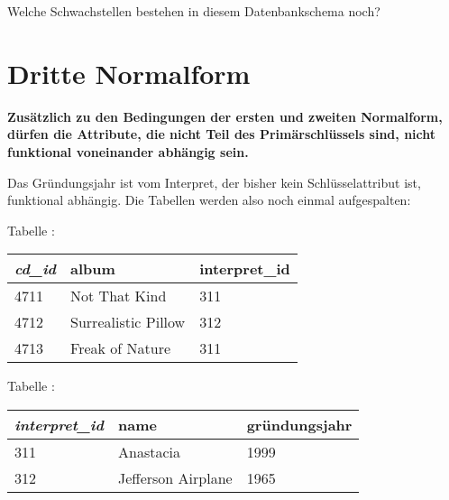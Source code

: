 Welche Schwachstellen bestehen in diesem Datenbankschema noch?


\section{Dritte Normalform}

\textbf{Zusätzlich zu den Bedingungen der ersten und zweiten Normalform, dürfen
die Attribute, die nicht Teil des Primärschlüssels sind, nicht funktional
voneinander abhängig sein.}

Das Gründungsjahr ist vom Interpret, der bisher kein Schlüsselattribut ist,
funktional abhängig. Die Tabellen werden also noch einmal aufgespalten:

\begin{minipage}{0.48\textwidth}
Tabelle :

\vspace{2mm}

\hspace{0mm}
\begin{tabular}{|l|l|l|}\hline
\textbf{\em cd\_id} & \textbf{album} & \textbf{interpret\_id}\\ \hline 
4711 & Not That Kind       & 311\\ \hline
4712 & Surrealistic Pillow & 312\\ \hline
4713 & Freak of Nature     & 311\\ \hline
\end{tabular}
\end{minipage}
\begin{minipage}{0.52\textwidth}
Tabelle :

\vspace{2mm}

\begin{tabular}{|l|l|l|}\hline
\textbf{\em interpret\_id} & \textbf{name} & \textbf{gründungsjahr}\\ \hline
311 & Anastacia          & 1999\\ \hline
312 & Jefferson Airplane & 1965\\ \hline
\end{tabular}
\end{minipage}

\vspace{4mm}

